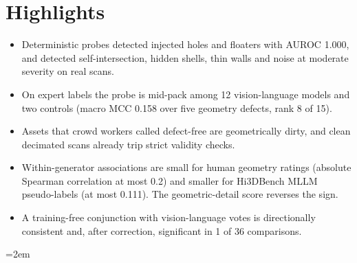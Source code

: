\documentclass[11pt,a4paper]{article}
\begin{document}
\section*{Highlights}
\begin{itemize}
  \item Deterministic probes detected injected holes and floaters with AUROC 1.000, and detected self-intersection, hidden shells, thin walls and noise at moderate severity on real scans.
  \item On expert labels the probe is mid-pack among 12 vision-language models and two controls (macro MCC 0.158 over five geometry defects, rank 8 of 15).
  \item Assets that crowd workers called defect-free are geometrically dirty, and clean decimated scans already trip strict validity checks.
  \item Within-generator associations are small for human geometry ratings (absolute Spearman correlation at most 0.2) and smaller for Hi3DBench MLLM pseudo-labels (at most 0.111). The geometric-detail score reverses the sign.
  \item A training-free conjunction with vision-language votes is directionally consistent and, after correction, significant in 1 of 36 comparisons.
\end{itemize}











\appendix




\emergencystretch=2em

\end{document}
